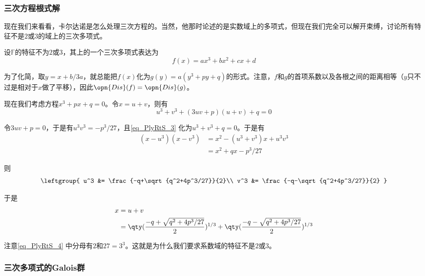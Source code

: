 \subsubsection{三次方程根式解}

现在我们来看看，卡尔达诺是怎么处理三次方程的。当然，他那时论述的是实数域上的多项式，但现在我们完全可以解开束缚，讨论所有特征不是$2$或$3$的域上的三次多项式。

设$\mathbb{F}$的特征不为$2$或$3$，其上的一个三次多项式表达为
\begin{equation}
f(x) = ax^3+bx^2+cx+d
\end{equation}

为了化简，取$y=x+b/3a$，就总能把$f(x)$化为$g(y)=a(y^3+py+q)$的形式。注意，$f$和$g$的首项系数以及各根之间的距离相等（$y$只不过是相对于$x$做了平移），因此$\opn{Dis}(f)=\opn{Dis}(g)$。

现在我们考虑方程$x^3+px+q=0$。令$x=u+v$，则有
\begin{equation}\label{eq_PlyRtS_3}
u^3+v^3+(3uv+p)(u+v)+q=0
\end{equation}

令$3uv+p=0$，于是有$u^3v^3=-p^3/27$，且\autoref{eq_PlyRtS_3} 化为$u^3+v^3+q=0$。于是有
\begin{equation}
\begin{aligned}
(x-u^3)(x-v^3) &= x^2-(u^3+v^3)x+u^3v^3\\
&= x^2+qx-p^3/27
\end{aligned}
\end{equation}

则
\begin{equation}
\leftgroup{
    u^3 &= \frac{-q+\sqrt{q^2+4p^3/27}}{2}\\
    v^3 &= \frac{-q-\sqrt{q^2+4p^3/27}}{2}
}
\end{equation}

于是
\begin{equation}\label{eq_PlyRtS_4}
\begin{aligned}
x&=u+v\\
&=\qty(\frac{-q+\sqrt{q^2+4p^3/27}}{2})^{1/3}+\qty(\frac{-q-\sqrt{q^2+4p^3/27}}{2})^{1/3}
\end{aligned}
\end{equation}

注意\autoref{eq_PlyRtS_4} 中分母有$2$和$27=3^3$。这就是为什么我们要求系数域的特征不是$2$或$3$。






\subsubsection{三次多项式的Galois群}


